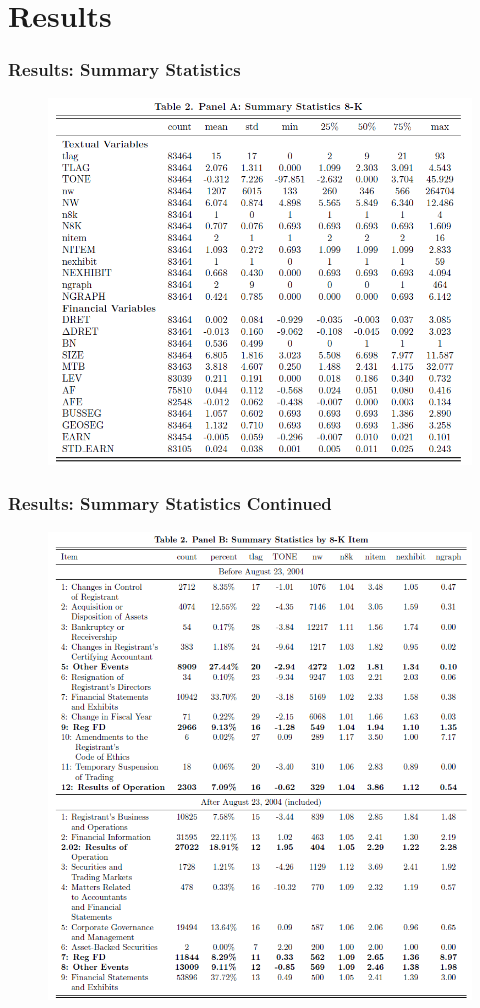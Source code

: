 \documentclass{beamer}
\begin{document}
\section{Results}
\begin{frame}
\frametitle{Results: Summary Statistics}
\begin{figure}[h]
	\centering
	\includegraphics[width=0.65\linewidth]{tab2panA}
	\label{tab2panA}
\end{figure}

\end{frame}
\begin{frame}
	\frametitle{Results: Summary Statistics Continued}
	\begin{figure}[h]
		\centering
		\includegraphics[width=0.55\linewidth]{tab2panB}
		\label{tab2panB}
	\end{figure}
	
\end{frame}
\end{document}
